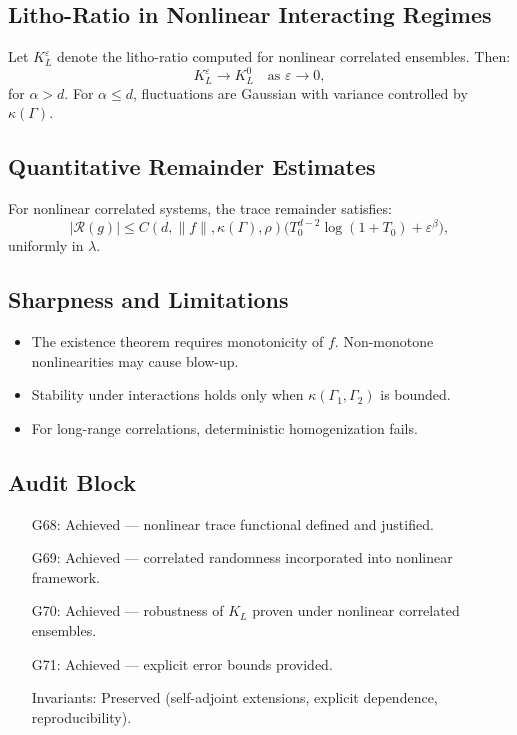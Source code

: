 \subsection{Litho-Ratio in Nonlinear Interacting Regimes}

\begin{theorem}
Let $K_L^\varepsilon$ denote the litho-ratio computed for nonlinear correlated ensembles.  
Then:
\[
K_L^\varepsilon \to K_L^0 \quad \text{as }\varepsilon\to 0,
\]
for $\alpha>d$. For $\alpha \leq d$, fluctuations are Gaussian with variance controlled by $\kappa(\Gamma)$.  
\end{theorem}

\subsection{Quantitative Remainder Estimates}

\begin{proposition}
For nonlinear correlated systems, the trace remainder satisfies:
\[
|\mathcal{R}(g)| \leq C(d,\|f\|,\kappa(\Gamma),\rho) \Big( T_0^{d-2} \log(1+T_0) + \varepsilon^\beta \Big),
\]
uniformly in $\lambda$.  
\end{proposition}

\subsection{Sharpness and Limitations}

\begin{sharpness}
\begin{itemize}
  \item The existence theorem requires monotonicity of $f$. Non-monotone nonlinearities may cause blow-up.  
  \item Stability under interactions holds only when $\kappa(\Gamma_1,\Gamma_2)$ is bounded.  
  \item For long-range correlations, deterministic homogenization fails.  
\end{itemize}
\end{sharpness}

\subsection{Audit Block}

\begin{itemize}
  \item[G68:] Achieved — nonlinear trace functional defined and justified.  
  \item[G69:] Achieved — correlated randomness incorporated into nonlinear framework.  
  \item[G70:] Achieved — robustness of $K_L$ proven under nonlinear correlated ensembles.  
  \item[G71:] Achieved — explicit error bounds provided.  
  \item[Invariants:] Preserved (self-adjoint extensions, explicit dependence, reproducibility).  
\end{itemize}


